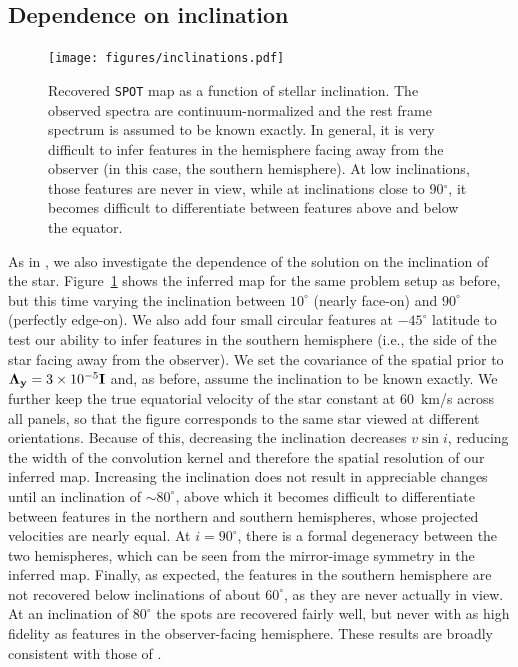 \documentclass[modern]{aastex631}
\begin{document}
\subsection{Dependence on inclination}
\label{sec:inc}
%
\begin{figure}[t!]
    \begin{centering}
        \texttt{[image: figures/inclinations.pdf]} %
        \caption{%
            Recovered \texttt{SPOT} map as a function of stellar inclination. 
            The observed spectra are continuum-normalized and the rest frame spectrum is assumed to be known exactly.
            In general, it is very difficult to infer features in the hemisphere facing away from the observer (in this case, the southern hemisphere). At low inclinations, those features are never in view, while at inclinations close to 90$^\circ$, it becomes difficult to differentiate between features above and below the equator.
        }
        \label{fig:inclinations}
    \end{centering}
\end{figure}
%
As in \citet{Vogt1987}, we also investigate the dependence of the solution on the inclination of the star.
Figure~\ref{fig:inclinations} shows the inferred map for the same problem setup as before, but this time varying the inclination between $10^\circ$ (nearly face-on) and $90^\circ$ (perfectly edge-on). 
We also add four small circular features at $-45^\circ$ latitude to test our ability to infer features in the southern hemisphere (i.e., the side of the star facing away from the observer).
We set the covariance of the spatial prior to $\boldsymbol{\Lambda}_{\mathbf{y}} = 3\times 10^{-5}{\mathbf{I}}$ and, as before, assume the inclination to be known exactly. 
We further keep the true equatorial velocity of the star constant at $60$~km/s across all panels, so that the figure corresponds to the same star viewed at different orientations. 
Because of this, decreasing the inclination decreases $v\sin i$, reducing the width of the convolution kernel and therefore the spatial resolution of our inferred map.
Increasing the inclination does not result in appreciable changes until an inclination of $\sim 80^\circ$, above which it becomes difficult to differentiate between features in the northern and southern hemispheres, whose projected velocities are nearly equal. 
At $i = 90^\circ$, there is a formal degeneracy between the two hemispheres, which can be seen from the mirror-image symmetry in the inferred map. 
Finally, as expected, the features in the southern hemisphere are not recovered below inclinations of about $60^\circ$, as they are never actually in view. 
At an inclination of $80^\circ$ the spots are recovered fairly well, but never with as high fidelity as features in the observer-facing hemisphere.
These results are broadly consistent with those of \citet{Vogt1987}.
\end{document}
